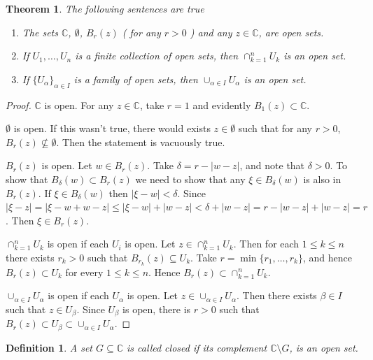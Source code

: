\documentclass{amsart}
\newtheorem{thm}{Theorem}
\newtheorem{mydef}{Definition}
\begin{document}
\begin{thm}
The following sentences are true
\begin{enumerate}
\item The sets \(\mathbb{C}\), \(\emptyset\), \(B_r(z)\) ( for any \(r>0\) ) and any \(z\in \mathbb{C}\), are open sets.
\item If \(U_1, \ldots, U_n\) is a finite collection of open sets, then \(\cap_{k=1}^n U_{k}\) is an open set.
\item If \(\{U_{\alpha}\}_{\alpha\in I}\) is a family of open sets, then \(\cup_{\alpha\in I}U_{\alpha}\) is an open set.
\end{enumerate}
\end{thm}
\begin{proof}
\(\mathbb{C}\) is open. For any \(z\in \mathbb{C}\), take \(r=1\) and evidently \(B_{1}(z)\subset \mathbb{C}\).

\(\emptyset\) is open. If this wasn't true, there would exists \(z\in \emptyset\) such that for any \(r>0\), \(B_{r}(z)\nsubseteq \emptyset\). Then the statement is vacuously true.

\(B_{r}(z)\) is open. Let \(w\in B_{r}(z)\). Take \(\delta = r - |w-z|\), and note that \(\delta >0\). To show that \(B_{\delta}(w) \subset B_{r}(z)\) we need to show that any \(\xi \in B_{\delta}(w)\) is also in \(B_{r}(z)\). If \(\xi \in B_{\delta}(w)\) then \(|\xi - w| < \delta\). Since \(|\xi - z| = |\xi - w + w - z| \leq |\xi - w| + | w - z| < \delta + |w-z| = r - |w-z| + |w-z| = r\). Then \(\xi \in B_{r}(z)\).

\(\cap_{k=1}^n U_k\) is open if each \(U_i\) is open. Let \(z\in\cap_{k=1}^n U_k\). Then for each \(1\leq k \leq n\) there exists \(r_{k}>0\) such that \(B_{r_k}(z) \subseteq U_k\). Take \(r = \min\{r_1,\ldots,r_k\}\), and hence \(B_{r}(z)\subset U_k\) for every \(1\leq k \leq n\). Hence \(B_{r}(z)\subset \cap_{k=1}^n U_k\).

\(\cup_{\alpha \in I} U_{\alpha}\) is open if each \(U_{\alpha}\) is open. Let \(z\in\cup_{\alpha \in I} U_{\alpha}\). Then there exists \(\beta \in I\) such that \(z \in U_{\beta}\). Since \(U_{\beta}\) is open, there is \(r >0\) such that \(B_{r}(z)\subset U_{\beta} \subset \cup_{\alpha \in I} U_{\alpha}\).
\end{proof}


\begin{mydef}
A set \(G\subseteq \mathbb{C}\) is called closed if its complement \(\mathbb{C}\setminus G\), is an open set.
\end{mydef}
\end{document}
